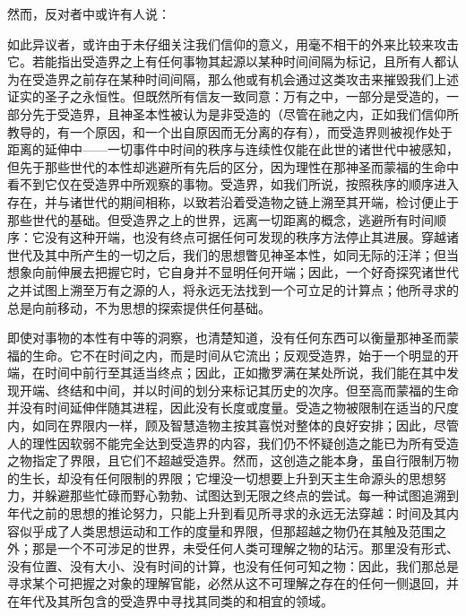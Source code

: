 然而，反对者中或许有人说：\par

如此异议者，或许由于未仔细关注我们信仰的意义，用毫不相干的外来比较来攻击它。若能指出受造界之上有任何事物其起源以某种时间间隔为标记，且所有人都认为在受造界之前存在某种时间间隔，那么他或有机会通过这类攻击来摧毁我们上述证实的圣子之永恒性。但既然所有信友一致同意：万有之中，一部分是受造的，一部分先于受造界，且神圣本性被认为是非受造的（尽管在祂之内，正如我们信仰所教导的，有一个原因，和一个出自原因而无分离的存有），而受造界则被视作处于距离的延伸中——一切事件中时间的秩序与连续性仅能在此世的诸世代中被感知，但先于那些世代的本性却逃避所有先后的区分，因为理性在那神圣而蒙福的生命中看不到它仅在受造界中所观察的事物。受造界，如我们所说，按照秩序的顺序进入存在，并与诸世代的期间相称，以致若沿着受造物之链上溯至其开端，检讨便止于那些世代的基础。但受造界之上的世界，远离一切距离的概念，逃避所有时间顺序：它没有这种开端，也没有终点可据任何可发现的秩序方法停止其进展。穿越诸世代及其中所产生的一切之后，我们的思想瞥见神圣本性，如同无际的汪洋；但当想象向前伸展去把握它时，它自身并不显明任何开端；因此，一个好奇探究诸世代之并试图上溯至万有之源的人，将永远无法找到一个可立足的计算点；他所寻求的总是向前移动，不为思想的探索提供任何基础。\par

即使对事物的本性有中等的洞察，也清楚知道，没有任何东西可以衡量那神圣而蒙福的生命。它不在时间之内，而是时间从它流出；反观受造界，始于一个明显的开端，在时间中前行至其适当终点；因此，正如撒罗满在某处所说，我们能在其中发现开端、终结和中间，并以时间的划分来标记其历史的次序。但至高而蒙福的生命并没有时间延伸伴随其进程，因此没有长度或度量。受造之物被限制在适当的尺度内，如同在界限内一样，顾及智慧造物主按其喜悦对整体的良好安排；因此，尽管人的理性因软弱不能完全达到受造界的内容，我们仍不怀疑创造之能已为所有受造之物指定了界限，且它们不超越受造界。然而，这创造之能本身，虽自行限制万物的生长，却没有任何限制的界限；它埋没一切想要上升到天主生命源头的思想努力，并躲避那些忙碌而野心勃勃、试图达到无限之终点的尝试。每一种试图追溯到年代之前的思想的推论努力，只能上升到看见所寻求的永远无法穿越：时间及其内容似乎成了人类思想运动和工作的度量和界限，但那超越之物仍在其触及范围之外；那是一个不可涉足的世界，未受任何人类可理解之物的玷污。那里没有形式、没有位置、没有大小、没有时间的计算，也没有任何可知之物：因此，我们那总是寻求某个可把握之对象的理解官能，必然从这不可理解之存在的任何一侧退回，并在年代及其所包含的受造界中寻找其同类的和相宜的领域。\par

